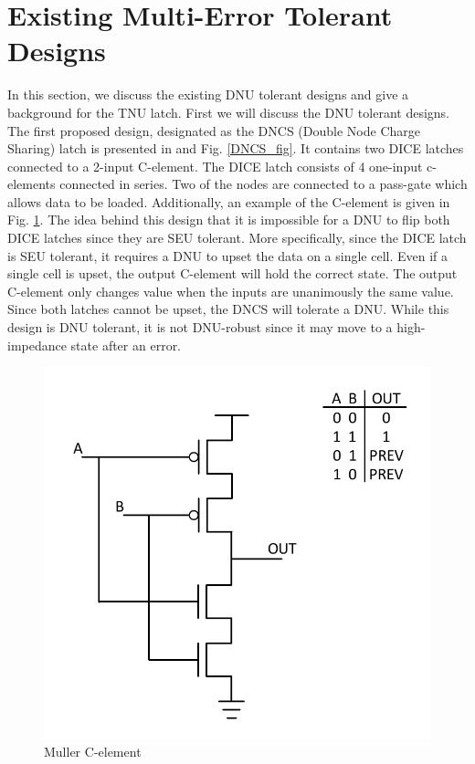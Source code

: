 \section{Existing Multi-Error Tolerant Designs} \label{sec:DNUdes}

In this section, we discuss the existing DNU tolerant designs and give a background for the TNU latch. First we will discuss the DNU tolerant designs. The first proposed design, designated as the DNCS (Double Node Charge Sharing) latch is presented in \cite{DNCS} and Fig. \ref{DNCS_fig}. It contains two DICE latches connected to a 2-input C-element. The DICE latch consists of 4 one-input c-elements connected in series. Two of the nodes are connected to a pass-gate which allows data to be loaded. Additionally, an example of the C-element is given in Fig. \ref{Cele_fig}. The idea behind this design that it is impossible for a DNU to flip both DICE latches since they are SEU tolerant. More specifically, since the DICE latch is SEU tolerant, it requires a DNU to upset the data on a single cell. Even if a single cell is upset, the output C-element will hold the correct state. The output C-element only changes value when the inputs are unanimously the same value. Since both latches cannot be upset, the DNCS will tolerate a DNU. While this design is DNU tolerant, it is not DNU-robust since it may move to a high-impedance state after an error. 

\begin{figure}[!htbp]
	\centering
	\includegraphics[trim = 0mm 6mm 0mm 7mm, clip, width=0.55\linewidth]{Figures/C_ele}	
	\caption{Muller C-element}
	\label{Cele_fig}
\end{figure}

